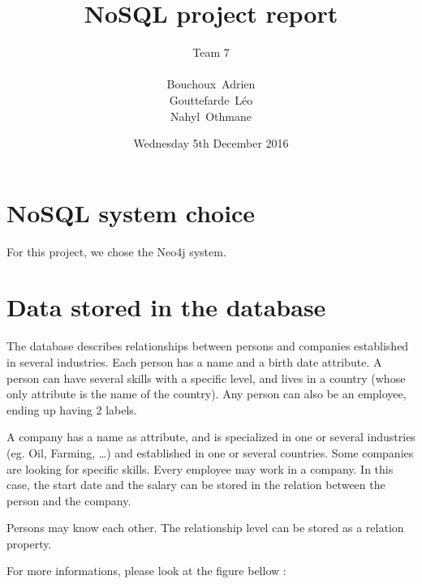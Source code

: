 \documentclass[a4paper, 11pt, titlepage]{article}
\title {{ {\huge NoSQL project report }} }
\author{\Large Team 7 \\
\\
    {\sc Bouchoux}~Adrien\\
    {\sc Gouttefarde}~Léo\\
    {\sc Nahyl}~Othmane
}
\date{Wednesday 5th December 2016}
\begin{document}
\pagestyle{fancy}
\maketitle

\setcounter{tocdepth}{2}

\tableofcontents
\newpage



\section {NoSQL system choice}

For this project, we chose the Neo4j system.


\section {Data stored in the database}


The database describes relationships between persons and companies established in several industries. Each person has a name and a birth date attribute. A person can have several skills with a specific level, and lives in a country (whose only attribute is the name of the country). Any person can also be an employee, ending up having 2 labels.

A company has a name as attribute, and is specialized in one or several industries (eg. Oil, Farming, …) and established in one or several countries.
Some companies are looking for specific skills. Every employee may work in a company. In this case, the start date and the salary can be stored in the relation between the person and the company.

Persons may know each other. The relationship level can be stored as a relation property.

For more informations, please look at the figure bellow :
\end{document}
